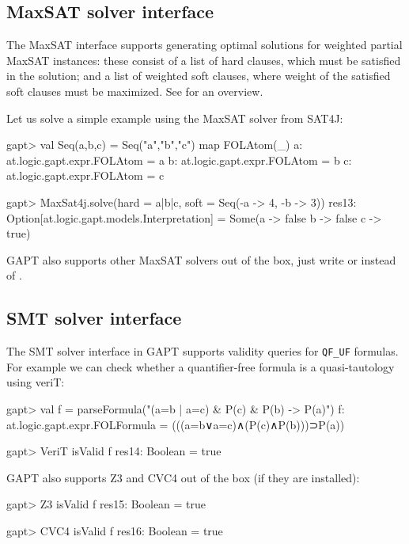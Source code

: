 \documentclass[a4paper,11pt]{article}
\newcommand{\cli}[1]{{\ttfamily {#1}}}
\begin{document}
\subsection{MaxSAT solver interface}

The MaxSAT interface supports generating optimal solutions for weighted partial
MaxSAT instances: these consist of a list of hard clauses, which must be
satisfied in the solution; and a list of weighted soft clauses, where weight of
the satisfied soft clauses must be maximized.  See \cite{Argelich2008First}
for an overview.

Let us solve a simple example using the MaxSAT solver from SAT4J:

\begin{clilisting}
gapt> val Seq(a,b,c) = Seq("a","b","c") map {FOLAtom(_)}
a: at.logic.gapt.expr.FOLAtom = a
b: at.logic.gapt.expr.FOLAtom = b
c: at.logic.gapt.expr.FOLAtom = c

gapt> MaxSat4j.solve(hard = a|b|c, soft = Seq(-a -> 4, -b -> 3))
res13: Option[at.logic.gapt.models.Interpretation] =
Some(a -> false
b -> false
c -> true)

\end{clilisting}

GAPT also supports other MaxSAT solvers out of the box, just write
\cli{OpenWBO} or \cli{ToySolver} instead of \cli{MaxSat4j}.

\subsection{SMT solver interface}

The SMT solver interface in GAPT supports validity queries for \verb,QF_UF,
formulas.  For example we can check whether a quantifier-free formula is a
quasi-tautology using veriT:
\begin{clilisting}
gapt> val f = parseFormula("(a=b | a=c) & P(c) & P(b) -> P(a)")
f: at.logic.gapt.expr.FOLFormula = (((a=b∨a=c)∧(P(c)∧P(b)))⊃P(a))

\end{clilisting}

\begin{clilisting}
gapt> VeriT isValid f
res14: Boolean = true

\end{clilisting}

GAPT also supports Z3 and CVC4 out of the box (if they are installed):
\begin{clilisting}
gapt> Z3 isValid f
res15: Boolean = true

gapt> CVC4 isValid f
res16: Boolean = true

\end{clilisting}
\end{document}
